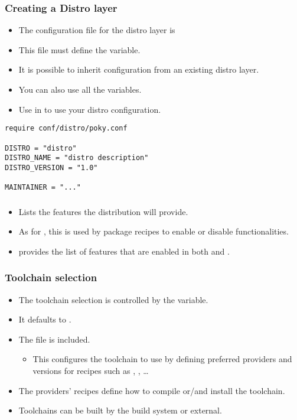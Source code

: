 \begin{frame}[fragile]
  \frametitle{Creating a Distro layer}
  \begin{itemize}
    \item The configuration file for the distro layer is
    \item This file must define the  variable.
    \item It is possible to inherit configuration from an existing
      distro layer.
    \item You can also use all the  variables.
    \item Use  in  to use
      your distro configuration.
  \end{itemize}
  \begin{block}{}
    \begin{verbatim}
require conf/distro/poky.conf

DISTRO = "distro"
DISTRO_NAME = "distro description"
DISTRO_VERSION = "1.0"

MAINTAINER = "..."
    \end{verbatim}
  \end{block}
\end{frame}

\begin{frame}
  \frametitle{}
  \begin{itemize}
    \item Lists the features the distribution will provide.
    \item As for , this is used by package
      recipes to enable or disable functionalities.
    \item {} provides the list of features that
      are enabled in both  and .
  \end{itemize}
\end{frame}

\begin{frame}
  \frametitle{Toolchain selection}
  \begin{itemize}
    \item The toolchain selection is controlled by the 
      variable.
    \item It defaults to .
    \item The  file is
      included.
    \begin{itemize}
      \item This configures the toolchain to use by defining preferred
        providers and versions for recipes such as ,
        , \dots
    \end{itemize}
    \item The providers' recipes define how to compile or/and install
      the toolchain.
    \item Toolchains can be built by the build system or external.
  \end{itemize}
\end{frame}


